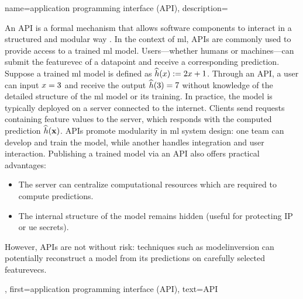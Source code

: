 {name={application programming interface (API)},
	description={
		An  API is a formal mechanism that 
		allows software components to interact in a structured and modular way \cite{RestfulBook2013}.
		In the context of \gls{ml}, APIs are commonly used to provide access to a trained \gls{ml} \gls{model}. 
		Users—whether humans or machines—can submit the \gls{featurevec} of a \gls{datapoint} and receive 
		a corresponding \gls{prediction}. Suppose a trained \gls{ml} \gls{model} is defined 
		as $\widehat{h}(x) := 2 x + 1$. Through an API, a user 
		can input $x = 3$ and receive the output $\widehat{h}(3) = 7$ 
		without knowledge of the detailed structure of the \gls{ml} \gls{model} or its training. 
		In practice, the \gls{model} is typically deployed on a server connected to the internet. 
		Clients send requests containing \gls{feature} values to the server, which responds with 
		the computed prediction $\widehat{h}({\bf x})$. APIs promote modularity 
		in \gls{ml} system design: one team can develop and train the model, while another 
		handles integration and user interaction. Publishing a trained \gls{model} via an API also 
		offers practical advantages: 
		\begin{itemize} 
			\item The server can centralize computational resources which are required to compute \gls{prediction}s. 
			\item The internal structure of the \gls{model} remains hidden (useful for protecting IP or ue secrets). 
		\end{itemize} 
		However, APIs are not without risk: techniques such as \gls{modelinversion} can potentially reconstruct a 
		\gls{model} from its \gls{prediction}s on carefully selected \gls{featurevec}s. 
	},
	first={application programming interface (API)},
	text={API}
}




